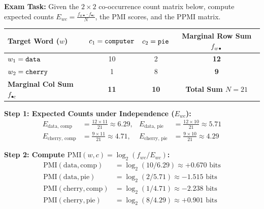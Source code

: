 \documentclass[10pt,a4paper]{article}
\begin{document}
\begin{examplebox}
\footnotesize
\textbf{Exam Task:} Given the $2 \times 2$ co-occurrence count matrix below, compute expected counts $E_{wc} = \frac{f_{w\bullet} \cdot f_{\bullet c}}{N}$, the PMI scores, and the PPMI matrix.

\vspace{1pt}
\centering
\begin{tabular}{l cc >{\bfseries}c}
\toprule
\textbf{Target Word ($w$)} & $c_1 = \text{\texttt{computer}}$ & $c_2 = \text{\texttt{pie}}$ & Marginal Row Sum $f_{w\bullet}$ \\
\midrule
$w_1 = \text{\texttt{data}}$   & 10 & 2  & 12 \\
$w_2 = \text{\texttt{cherry}}$ & 1  & 8  & 9 \\
\midrule
\textbf{Marginal Col Sum $f_{\bullet c}$} & \textbf{11} & \textbf{10} & Total Sum $N = 21$ \\
\bottomrule
\end{tabular}

\vspace{2pt}
\flushleft
\noindent\begin{minipage}[t]{0.49\textwidth}
\textbf{Step 1: Expected Counts under Independence ($E_{wc}$):}
\begin{align*}
    E_{\text{data, comp}}   &= \tfrac{12 \times 11}{21} \approx \mathbf{6.29}, &
    E_{\text{data, pie}}    &= \tfrac{12 \times 10}{21} \approx \mathbf{5.71} \\
    E_{\text{cherry, comp}} &= \tfrac{9 \times 11}{21} \approx \mathbf{4.71}, &
    E_{\text{cherry, pie}}  &= \tfrac{9 \times 10}{21} \approx \mathbf{4.29}
\end{align*}
\end{minipage}\hfill
\begin{minipage}[t]{0.49\textwidth}
\textbf{Step 2: Compute $\text{PMI}(w, c) = \log_2 (f_{wc} / E_{wc})$:}
\begin{align*}
    \text{PMI}(\text{data}, \text{comp})   &= \log_2(10 / 6.29) \approx \mathbf{+0.670} \text{ bits} \\
    \text{PMI}(\text{data}, \text{pie})    &= \log_2(2 / 5.71) \approx \mathbf{-1.515} \text{ bits} \\
    \text{PMI}(\text{cherry}, \text{comp}) &= \log_2(1 / 4.71) \approx \mathbf{-2.238} \text{ bits} \\
    \text{PMI}(\text{cherry}, \text{pie})  &= \log_2(8 / 4.29) \approx \mathbf{+0.901} \text{ bits}
\end{align*}
\end{minipage}


\end{examplebox}
\end{document}

